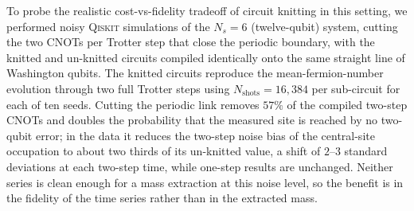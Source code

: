 To probe the realistic cost-vs-fidelity tradeoff of circuit knitting in
this setting, we performed noisy \textsc{Qiskit} simulations of the
$N_s=6$ (twelve-qubit) system, cutting the two CNOTs per Trotter step that
close the periodic boundary, with the knitted and un-knitted circuits
compiled identically onto the same straight line of Washington qubits.  The
knitted circuits reproduce the mean-fermion-number evolution through two
full Trotter steps using $N_{\mathrm{shots}}=16{,}384$ per sub-circuit for
each of ten seeds.  Cutting the periodic link removes $57\%$ of the compiled
two-step CNOTs and doubles the probability that the measured site is reached
by no two-qubit error; in the data it reduces the two-step noise bias of the
central-site occupation to about two thirds of its un-knitted value, a shift
of $2$--$3$ standard deviations at each two-step time, while one-step results
are unchanged.  Neither series is clean enough for a mass extraction at this
noise level, so the benefit is in the fidelity of the time series rather than
in the extracted mass.
